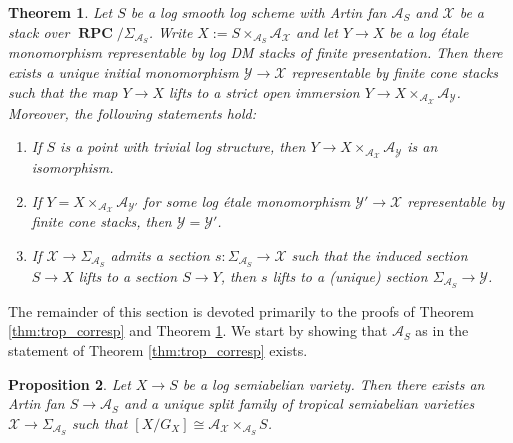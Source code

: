 \documentclass[11pt]{amsart}
\newtheorem{theorem}{Theorem}[section]
\newtheorem{proposition}[theorem]{Proposition}
\theoremstyle{definition}
\theoremstyle{remark}
\DeclareMathOperator{\RPC}{\mathbf{RPC}}
\begin{document}
\begin{theorem}
	\label{thm:trop_cpt_open_subsets}
	Let $S$ be a log smooth log scheme with Artin fan $\mathcal{A}_{S}$ and $\mathcal{X}$ be a stack over $\RPC/\Sigma_{\mathcal{A}_S}$.
	Write $X:=S\times_{\mathcal{A}_S}\mathcal{A}_{\mathcal{X}}$ and let
	$Y\to X$ be a log étale monomorphism representable by log DM stacks of finite presentation. Then there
	exists a unique initial monomorphism $\mathcal{Y}\to \mathcal{X}$ representable by finite cone stacks such that the map
	$Y\to X$ lifts to a strict open immersion $Y\to X\times_{\mathcal{A}_{\mathcal{X}}}\mathcal{A}_{\mathcal{Y}}$.
	Moreover, the following statements hold:
\begin{enumerate}
	\item If $S$ is a point with trivial log structure, then $Y\to X\times_{\mathcal{A}_{\mathcal{X}}}\mathcal{A}_{\mathcal{Y}}$ is an isomorphism.
	\item If $Y=X\times_{\mathcal{A}_{\mathcal{X}}}\mathcal{A}_{\mathcal{Y}'}$ for some log étale monomorphism $\mathcal{Y}'\to \mathcal{X}$ representable by finite cone stacks, then $\mathcal{Y}=\mathcal{Y}'$.
	\item If $\mathcal{X}\to \Sigma_{\mathcal{A}_S}$ admits a section $s:\Sigma_{\mathcal{A}_S}\to \mathcal{X}$ such
		that the induced section $S\to X$ lifts to a section $S\to Y$, then $s$ lifts to a (unique) section $\Sigma_{\mathcal{A}_S}\to \mathcal{Y}$.
\end{enumerate}
\end{theorem}

The remainder of this section is devoted primarily to the proofs of Theorem
\ref{thm:trop_corresp} and Theorem \ref{thm:trop_cpt_open_subsets}. We start
by showing that $\mathcal{A}_S$ as in the statement of Theorem
\ref{thm:trop_corresp} exists.

\begin{proposition}
	\label{prop:A_S_exists}
	Let $X\to S$ be a log semiabelian variety. Then there exists an Artin fan $S\to \mathcal{A}_S$ and a
	unique split family of tropical semiabelian varieties $\mathcal{X}\to \Sigma_{\mathcal{A}_S}$ such that $[X/G_X]\cong \mathcal{A}_{\mathcal{X}}\times_{\mathcal{A}_S}S$.
\end{proposition}
\end{document}
